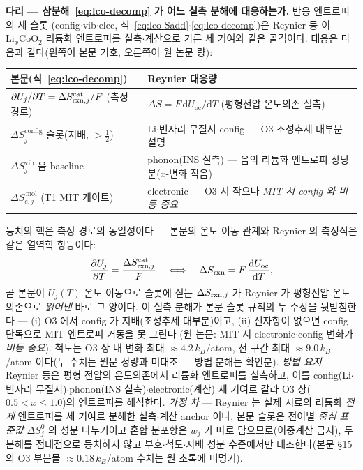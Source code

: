 \begin{srcbox}
\textbf{다리 --- 삼분해~\eqref{eq:lco-decomp} 가 어느 실측 분해에 대응하는가.} 반응 엔트로피의 세 슬롯
(config$\cdot$vib$\cdot$elec, 식~\eqref{eq:lco-Sadd}$\cdot$\eqref{eq:lco-decomp})은 Reynier
등\cite{reynier2004} 이 $\mathrm{Li}_x\mathrm{CoO_2}$ 리튬화 엔트로피를 실측$\cdot$계산으로 가른 세 기여와
같은 골격이다. 대응은 다음과 같다(왼쪽이 본문 기호, 오른쪽이 원 논문 량):
\begin{center}\footnotesize
\begin{tabular}{@{}ll@{}}
\hline
본문(식~\eqref{eq:lco-decomp}) & Reynier\cite{reynier2004} 대응량 \\
\hline
$\partial U_j/\partial T=\Delta S_{\mathrm{rxn},j}^\mathrm{cat}/F$ (측정 경로) & $\Delta S=F\,\mathrm dU_\mathrm{oc}/\mathrm dT$ (평형전압 온도의존 실측) \\
$\Delta S_j^\mathrm{config}$ 슬롯(지배, $>\tfrac12$) & Li$\cdot$빈자리 무질서 config --- O3 조성추세 대부분 설명 \\
$\Delta S_j^\mathrm{vib}$ 음 baseline & phonon(INS 실측) --- 음의 리튬화 엔트로피 상당분($x$-변화 작음) \\
$\Delta S_{e,j}^{\,\mathrm{mol}}$ (T1 MIT 게이트) & electronic --- O3 서 작으나 \emph{MIT 서 config 와 비등 중요} \\
\hline
\end{tabular}
\end{center}
등치의 핵은 측정 경로의 동일성이다 --- 본문의 온도 이동 관계와 Reynier 의 측정식은 같은 열역학
항등이다:
\begin{equation}
\frac{\partial U_j}{\partial T}=\frac{\Delta S_{\mathrm{rxn},j}^\mathrm{cat}}{F}
\quad\Longleftrightarrow\quad
\Delta S_{\mathrm{rxn}}=F\,\frac{\mathrm dU_\mathrm{oc}}{\mathrm dT},
\label{eq:br-reynier2004-1}
\end{equation}
곧 본문이 $U_j(T)$ 온도 이동으로 슬롯에 싣는 $\Delta S_{\mathrm{rxn},j}$ 가 Reynier 가 평형전압 온도의존으로
\emph{읽어낸} 바로 그 양이다. 이 실측 분해가 본문 슬롯 규칙의 두 주장을 뒷받침한다 --- (i) O3 에서
config 가 지배(조성추세 대부분)이고, (ii) 전자항이 없으면 config 단독으로 MIT 엔트로피 거동을 못 그린다
(원 논문: MIT 서 electronic$\cdot$config 변화가 \emph{비등 중요}). 척도는 O3 상 내 변화 최대
$\approx4.2\,k_B$/atom, 전 구간 최대 $\approx9.0\,k_B$/atom 이다(두 수치는 원문 정량과 미대조 --- 방법$\cdot$분해는 확인분). \emph{방법 요지} --- Reynier 등은 평형
전압의 온도의존에서 리튬화 엔트로피를 실측하고, 이를 config(Li$\cdot$빈자리 무질서)$\cdot$phonon(INS
실측)$\cdot$electronic(계산) 세 기여로 갈라 O3 상($0.5{<}x{\le}1.0$)의 엔트로피를 해석한다. \emph{가정
차} --- Reynier 는 실제 시료의 리튬화 \emph{전체} 엔트로피를 세 기여로 분해한 실측$\cdot$계산 anchor 이나,
본문 슬롯은 전이별 \emph{중심 표준값} $\Delta S_j^0$ 의 성분 나누기이고 혼합 분포항은 $w_j$ 가 따로
담으므로(이중계산 금지), 두 분해를 점대점으로 등치하지 않고 부호$\cdot$척도$\cdot$지배 성분 수준에서만
대조한다(본문 §15 의 O3 부분몰 $\approx0.18\,k_B$/atom 수치는 원 초록에 미명기).
\end{srcbox}

